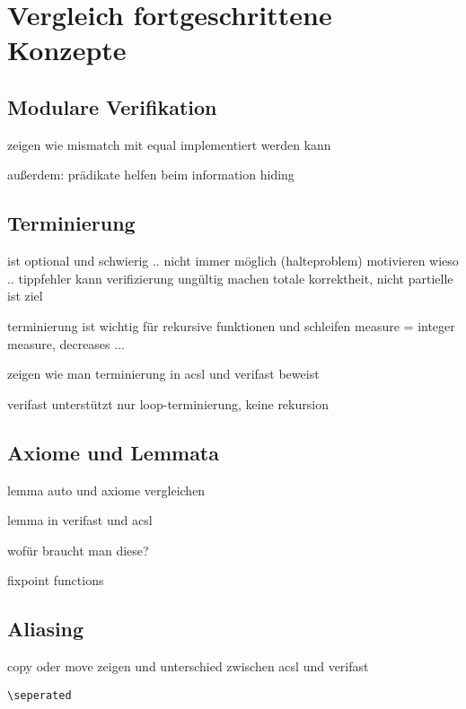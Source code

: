 ﻿
\chapter{Vergleich fortgeschrittene Konzepte}

\section{Modulare Verifikation}

zeigen wie mismatch mit equal implementiert werden kann

außerdem: prädikate helfen beim information hiding

\section{Terminierung}

ist optional und schwierig .. nicht immer möglich (halteproblem)
motivieren wieso .. tippfehler kann verifizierung ungültig machen
totale korrektheit, nicht partielle ist ziel


terminierung ist wichtig für rekursive funktionen und schleifen
measure = integer measure, decreases ...

zeigen wie man terminierung in acsl und verifast beweist

verifast unterstützt nur loop-terminierung, keine rekursion


\section{Axiome und Lemmata}

lemma auto und axiome vergleichen

lemma in verifast und acsl

wofür braucht man diese?

fixpoint functions

\section{Aliasing}

copy oder move zeigen und unterschied zwischen acsl und verifast

\lstinline{\seperated}


